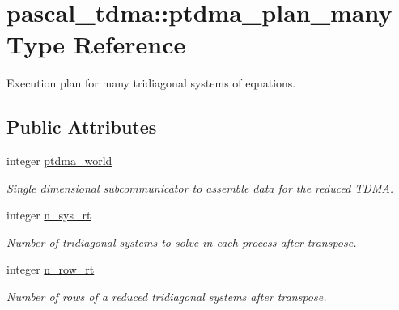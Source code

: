 \hypertarget{structpascal__tdma_1_1ptdma__plan__many}{}\section{pascal\+\_\+tdma\+::ptdma\+\_\+plan\+\_\+many Type Reference}
\label{structpascal__tdma_1_1ptdma__plan__many}


Execution plan for many tridiagonal systems of equations.  


\subsection*{Public Attributes}
\begin{DoxyCompactItemize}
\item 
integer \mbox{\hyperlink{structpascal__tdma_1_1ptdma__plan__many_acb7e645e37c791564905c6e2808db0c6}{ptdma\+\_\+world}}
\begin{DoxyCompactList}\small\item\em Single dimensional subcommunicator to assemble data for the reduced T\+D\+MA. \end{DoxyCompactList}\item 
integer \mbox{\hyperlink{structpascal__tdma_1_1ptdma__plan__many_a22b42947ab742f83aad3bbeb3a42a0f6}{n\+\_\+sys\+\_\+rt}}
\begin{DoxyCompactList}\small\item\em Number of tridiagonal systems to solve in each process after transpose. \end{DoxyCompactList}\item 
integer \mbox{\hyperlink{structpascal__tdma_1_1ptdma__plan__many_ad94248e2aa0653f151f0575d62d6fff7}{n\+\_\+row\+\_\+rt}}
\begin{DoxyCompactList}\small\item\em Number of rows of a reduced tridiagonal systems after transpose. \end{DoxyCompactList}\end{DoxyCompactItemize}
\textbf{ }\par
